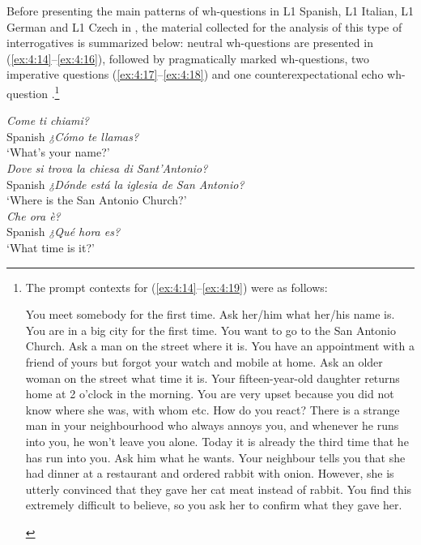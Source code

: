 Before presenting the main patterns of wh-questions in L1 Spanish, L1 Italian, L1 German and L1 Czech in , the material collected for the analysis of this type of interrogatives is summarized below: neutral wh-questions are presented in (\ref{ex:4:14}--\ref{ex:4:16}), followed by pragmatically marked wh-questions, two imperative questions (\ref{ex:4:17}--\ref{ex:4:18}) and one counterexpectational echo wh-question .\footnote{The prompt contexts for (\ref{ex:4:14}--\ref{ex:4:19}) were as follows:
\begin{exe}
 You meet somebody for the first time. Ask her/him what her/his name is.
 You are in a big city for the first time. You want to go to the San Antonio Church. Ask a man on the street where it is.
 You have an appointment with a friend of yours but forgot your watch and mobile at home. Ask an older woman on the street what time it is.
 Your fifteen-year-old daughter returns home at 2 o’clock in the morning. You are very upset because you did not know where she was, with whom etc. How do you react?
 There is a strange man in your neighbourhood who always annoys you, and whenever he runs into you, he won’t leave you alone. Today it is already the third time that he has run into you. Ask him what he wants.
 Your neighbour tells you that she had dinner at a restaurant and ordered rabbit with onion. However, she is utterly convinced that they gave her cat meat instead of rabbit. You find this extremely difficult to believe, so you ask her to confirm what they gave her.
\end{exe}}



\ea\label{ex:4:14}      \textit{Come ti chiami?}\\
Spanish   \textit{¿Cómo te llamas?}\\
{}      {‘What’s your name?’}\\



\ex\label{ex:4:15}      \textit{Dove si trova la chiesa di Sant’Antonio?}\\
Spanish   \textit{¿Dónde está la iglesia de San Antonio?}\\
{}      {‘Where is the San Antonio Church?’}\\



\ex\label{ex:4:16}      \textit{Che ora è?}\\
Spanish   \textit{¿Qué hora es?}\\
{}      {‘What time is it?’}\\



